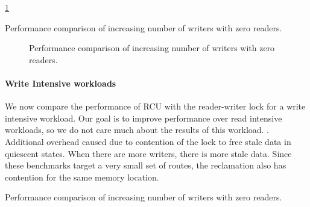 \documentclass{article}
\begin{document}
\begin{table}[tph]
\begin{center}

\end{center}
\label{tbl:micro_vr_1w}\ref{img:micro_vr_1w}
\caption{Performance comparison of increasing number of writers with zero readers.}
\end{table}

\begin{figure}[tph]
\begin{center}
\caption{Performance comparison of increasing number of writers with zero readers.}
\label{img:micro_vr_1w}
\end{center}
\end{figure}

\paragraph{Write Intensive workloads}
We now compare the performance of RCU with the reader-writer lock for a write intensive workload. Our goal is to improve performance over read intensive workloads, so we do not care much about the results of this workload. . Additional overhead caused due to contention of the lock to free stale data in quiescent states. When there are more writers, there is more stale data. Since these benchmarks target a very small set of routes, the reclamation also has contention for the same memory location.

\begin{table}[tph]
\begin{center}

\end{center}
\label{tbl:micro_0r_vw}
\caption{Performance comparison of increasing number of writers with zero readers.}
\end{table}
\end{document}
